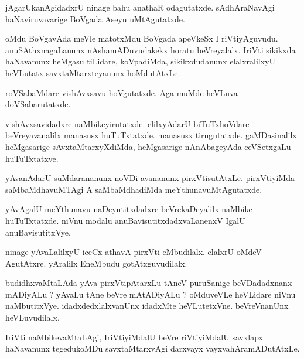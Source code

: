 \documentclass{article}
\begin{document}
\begin{mn}
jAgarUkanAgidadxrU  ninage  bahu  anathaR  odagutatxde.  sAdhAraNavAgi  haNaviruvavarige  BoVgada  Aseyu  uMtAgutatxde.
\end{mn}

\begin{mn}
oMdu  BoVgavAda  meVle  matotxMdu  BoVgada  apeVkeSx  I  riVtiyAguvudu.  anuSAthxnagaLanunx  nAshamADuvudakekx  
horatu  beVreyalalx.  IriVti  sikikxda  haNavanunx  heMgasu  tiLidare,  koVpadiMda,  sikikxdudanunx  elalxralilxyU  
heVLutatx  savxtaMtarxteyanunx  hoMdutAtxLe.
\end{mn}

\begin{mn}
roVSabaMdare  vishAvxsavu  hoVgutatxde.  Aga  muMde  heVLuva  doVSabarutatxde.
\end{mn}

\begin{mn}
vishAvxsavidadxre  naMbikeyirutatxde.  elilxyAdarU  biTuTxhoVdare  beVreyavanalilx  manasusx  huTuTxtatxde.  manasusx  
tirugutatxde.  gaMDasinalilx  heMgasarige  sAvxtaMtarxyXdiMda,  heMgasarige  nAnAbageyAda  ceVSetxgaLu  huTuTxtatxve.
\end{mn}

\begin{mn}
yAvanAdarU  suMdarananunx  noVDi  avananunx  pirxVtisutAtxLe.  pirxVtiyiMda  saMbaMdhavuMTAgi  A  saMbaMdhadiMda  meYthunavuMtAgutatxde.
\end{mn}

\begin{mn}
yAvAgalU  meYthunavu  naDeyutitxdadxre  beVrekaDeyalilx  naMbike  huTuTxtatxde.  niVnu  modalu  anuBavisutitxdadxvaLanenxV  
IgalU  anuBavisutitxVye.
\end{mn}

\begin{mn}
ninage  yAvaLalilxyU  iceCx  athavA  pirxVti  eMbudilalx.  elalxrU  oMdeV  AgutAtxre.  yAralilx  EneMbudu  gotAtxguvudilalx.
\end{mn}

\begin{mn}
budidhxvaMtaLAda  yAva  pirxVtipAtarxLu  tAneV  puruSanige  beVDadadxnanx  mADiyALu ?  yAvaLu tAne  beVre  mAtADiyALu ?  
oMduveVLe  heVLidare  niVnu  naMbutitxVye.  idadxdedxlalxvanUnx  idadxMte  heVLutetxVne.  beVreVnanUnx  heVLuvudilalx.
\end{mn}

\begin{mn}
IriVti  naMbikevaMtaLAgi,  IriVtiyiMdalU  beVre  riVtiyiMdalU  savxlapx  haNavanunx  tegedukoMDu  savxtaMtarxvAgi  
darxvayx  vayxvahAramADutAtxLe.
\end{mn}
\end{document}
